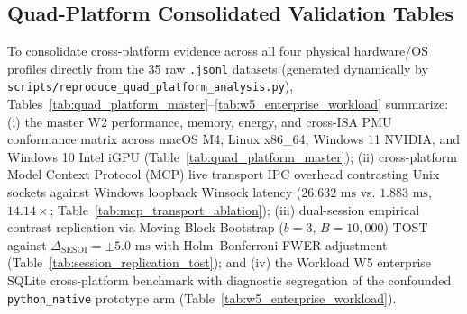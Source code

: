 \documentclass[11pt,a4paper]{article}
\begin{document}



\subsection{Quad-Platform Consolidated Validation Tables}
\label{sec:quad_platform_tables}
To consolidate cross-platform evidence across all four physical hardware/OS profiles directly from the 35 raw \texttt{.jsonl} datasets (generated dynamically by \texttt{scripts/reproduce\_quad\_platform\_analysis.py}), Tables~\ref{tab:quad_platform_master}--\ref{tab:w5_enterprise_workload} summarize: (i) the master W2 performance, memory, energy, and cross-ISA PMU conformance matrix across macOS M4, Linux x86\_64, Windows 11 NVIDIA, and Windows 10 Intel iGPU (Table~\ref{tab:quad_platform_master}); (ii) cross-platform Model Context Protocol (MCP) live transport IPC overhead contrasting Unix sockets against Windows loopback Winsock latency ($26.632\text{ ms}$ vs. $1.883\text{ ms}$, $14.14\times$; Table~\ref{tab:mcp_transport_ablation}); (iii) dual-session empirical contrast replication via Moving Block Bootstrap ($b=3$, $B=10{,}000$) TOST against $\Delta_{\text{SESOI}} = \pm 5.0\text{ ms}$ with Holm--Bonferroni FWER adjustment (Table~\ref{tab:session_replication_tost}); and (iv) the Workload W5 enterprise SQLite cross-platform benchmark with diagnostic segregation of the confounded \texttt{python\_native} prototype arm (Table~\ref{tab:w5_enterprise_workload}).





\end{document}
